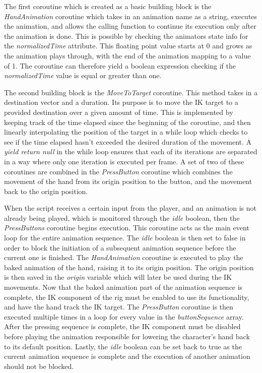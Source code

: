 The first coroutine which is created as a basic building block is the
\textit{HandAnimation} coroutine which takes in an animation name as a string,
executes the animation, and allows the calling function to continue its
execution only after the animation is done. This is possible by checking the
animators state info for the \textit{normalizedTime} attribute. This floating
point value starts at 0 and grows as the animation plays through, with the end
of the animation mapping to a value of 1. The coroutine can therefore yield
a boolean expression checking if the \textit{normalizedTime} value is equal or
greater than one. 

The second building block is the \textit{MoveToTarget} coroutine. This method
takes in a destination vector and a duration. Its purpose is to move the IK
target to a provided destination over a given amount of time. This is
implemented by keeping track of the time elapsed since the beginning of the
coroutine, and then linearly interpolating the position of the target
in a while loop which checks to see if the time elapsed hasn't exceeded the
desired duration of the movement. A \textit{yield return null} in the while loop
ensures that each of its iterations are separated in a way where only one
iteration is executed per frame. A set of two of these coroutines are combined
in the \textit{PressButton} coroutine which combines the movement of the hand
from its origin position to the button, and the movement back to the origin
position.

When the script receives a certain input from the player, and an animation is
not already being played, which is monitored through the \textit{idle} boolean,
then the \textit{PressButtons} coroutine begins execution. This coroutine acts as the
main event loop for the entire animation sequence. The \textit{idle} boolean is
then set to false in order to block the initiation of a subsequent animation
sequence before the current one is finished. The \textit{HandAnimation}
coroutine is executed to play the baked animation of the hand, raising it to its
origin position. The origin position is then saved in the \textit{origin}
variable which will later be used during the IK movements. Now that the baked
animation part of the animation sequence is complete, the IK component of the
rig must be enabled to use its functionality, and have the hand track the IK
target. The \textit{PressButton} coroutine is then executed multiple times in
a loop for every value in the \textit{buttonSequence} array. After the pressing
sequence is complete, the IK component must be disabled before playing the
animation responsible for lowering the character's hand back to its default
position. Lastly, the \textit{idle} boolean can be set back to true as the
current animation sequence is complete and the execution of another animation
should not be blocked.

